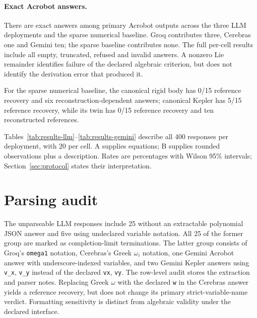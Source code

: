 \documentclass[10pt]{article}
\begin{document}
\paragraph{Exact Acrobot answers.} There are \nAcrobotExact{} exact answers among \nAcrobot{} primary Acrobot outputs across the three LLM deployments and the sparse numerical baseline. Groq contributes three, Cerebras one and Gemini ten; the sparse baseline contributes none. The full per-cell results include all empty, truncated, refused and invalid answers. A nonzero Lie remainder identifies failure of the declared algebraic criterion, but does not identify the derivation error that produced it.

For the sparse numerical baseline, the canonical rigid body has 0/15 reference recovery and six reconstruction-dependent answers; canonical Kepler has 5/15 reference recovery, while its twin has 0/15 reference recovery and ten reconstructed references.

Tables~\ref{tab:results-llm}--\ref{tab:results-gemini} describe all 400 responses per deployment, with 20 per cell. A supplies equations; B supplies rounded observations plus a description. Rates are percentages with Wilson 95\% intervals; Section~\ref{sec:protocol} states their interpretation.

\begin{table}[!htbp]
\centering\small
\tabLLMGroq
\caption{Groq \texttt{openai/gpt-oss-120b}: 400 primary responses, 20 per cell.}
\label{tab:results-llm}
\end{table}
\begin{table}[!htbp]
\centering\small
\tabLLMCerebras
\caption{Cerebras \texttt{gpt-oss-120b}: 400 primary responses, 20 per cell.}
\label{tab:results-cerebras}
\end{table}
\begin{table}[!htbp]
\centering\small
\tabLLMGemini
\caption{Google AI Studio \texttt{gemini-3.5-flash-lite}: 400 primary responses, 20 per cell.}
\label{tab:results-gemini}
\end{table}

\section{Parsing audit}\label{app:parsing}

The \nUnparseable{} unparseable LLM responses include 25 without an extractable polynomial JSON answer and five using undeclared variable notation. All 25 of the former group are marked as completion-limit terminations. The latter group consists of Groq's \texttt{omega1} notation, Cerebras's Greek $\omega_i$ notation, one Gemini Acrobot answer with underscore-indexed variables, and two Gemini Kepler answers using \texttt{v\_x}, \texttt{v\_y} instead of the declared \texttt{vx}, \texttt{vy}. The row-level audit stores the extraction and parser notes. Replacing Greek $\omega$ with the declared \texttt{w} in the Cerebras answer yields a reference recovery, but does not change its primary strict-variable-name verdict. Formatting sensitivity is distinct from algebraic validity under the declared interface.
\end{document}
